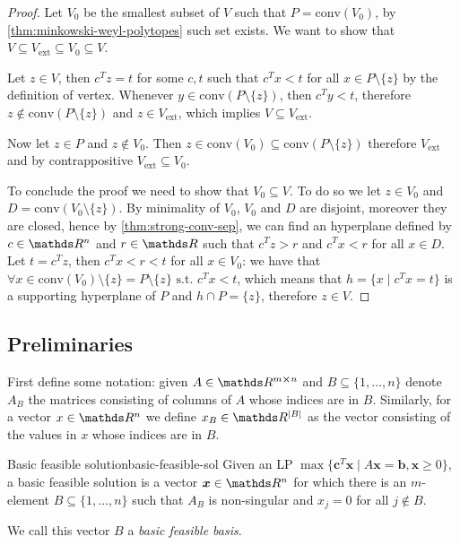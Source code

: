\documentclass[12pt]{extarticle}
\renewcommand{\vec}[1]{\bm{#1}}
\begin{document}
\begin{proof}
	Let $V_0$ be the smallest subset of $V$ such that $P = \mathrm{conv}(V_0)$,
	by \cref{thm:minkowski-weyl-polytopes} such set exists.
	We want to show that $V \subseteq V_\text{ext} \subseteq V_0 \subseteq V$.

	Let $z \in V$, then $c^T z = t$ for some $c, t$ such that $c^T x < t$
	for all $x \in P \setminus \{z\}$ by the definition of vertex.
	Whenever $y \in \mathrm{conv}(P\setminus \{z\})$, then $c^T y < t$, therefore
	$z \notin \mathrm{conv}(P\setminus \{z\})$ and $z \in V_\text{ext}$,
	which implies $V \subseteq V_\text{ext}$.

	Now let $z \in P$ and $z \notin V_0$.
	Then $z \in \mathrm{conv}(V_0) \subseteq \mathrm{conv}(P \setminus \{z\})$
	therefore $V_\text{ext}$ and by contrappositive $V_\text{ext} \subseteq V_0$.

	To conclude the proof we need to show that $V_0 \subseteq V$. To do so we let $z \in V_0$
	and $D = \mathrm{conv}(V_0 \setminus \{z\})$. By minimality of $V_0$, $V_0$ and $D$ are disjoint,
	moreover they are closed, hence by \cref{thm:strong-conv-sep}, we can find an hyperplane defined
	by $c \in \R^n$ and $r \in \R$ such that $c^T z > r$ and $c^T x < r$ for all $x \in D$.
	Let $t = c^T z$, then $c^T x < r < t$ for all $x \in V_0$:
	we have that $\forall x \in \mathrm{conv}(V_0) \setminus \{z\} =
		P \setminus \{z\} \text{ s.t. } c^T x < t$,	which means that $h = \{ x \mid c^T x = t \}$
	is a supporting hyperplane of $P$ and $h \cap P = \{z\}$, therefore $z \in V$.
\end{proof}

\subsection{Preliminaries}

First define some notation: given $A \in \R^{m \cross n}$ and $B \subseteq \{1, \dots, n\}$ denote
$A_B$ the matrices consisting of columns of $A$ whose indices are in $B$.
Similarly, for a vector $x \in \R^n$ we define $x_B \in \R^\abs{B}$ as the vector consisting
of the values in $x$ whose indices are in $B$.

\begin{definition}{Basic feasible solution}{basic-feasible-sol}
	Given an LP $\max \{ \vec c^T \vec x \mid A \vec x = \vec b, \vec x \geq 0\}$, a basic feasible solution
	is a vector $\vec x \in \R^n$ for which there is an $m$-element $B \subseteq \{1, \dots, n\}$
	such that $A_B$ is non-singular and $x_j = 0$ for all $j \notin B$.

	We call this vector $B$ a \emph{basic feasible basis}.
\end{definition}
\end{document}
